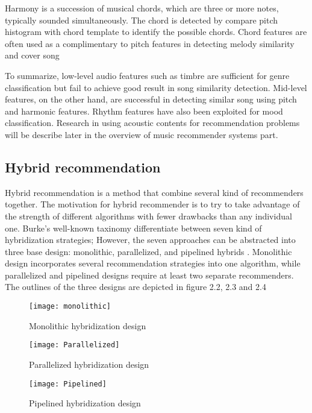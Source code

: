 Harmony is a succession of musical chords, which are three or more notes, typically sounded simultaneously. The chord is detected by compare pitch histogram with chord template to identify the possible chords. Chord features are often used as a complimentary to pitch features in detecting melody similarity and cover song \cite{ellis2007identifyingcover} \cite{bello2007audio}

To summarize, low-level audio features such as timbre are sufficient for genre classification but fail to achieve good result in song similarity detection. Mid-level features, on the other hand, are successful in detecting similar song using pitch and harmonic features. Rhythm features have also been exploited for mood classification. Research in using acoustic contents for recommendation problems will be describe later in the overview of music recommender systems part. 

\subsection{Hybrid recommendation}
Hybrid recommendation is a method that combine several kind of recommenders together. The motivation for hybrid recommender is to try to take advantage of the strength of different algorithms with fewer drawbacks than any individual one. Burke's well-known taxinomy \cite{burke2002hybrid} differentiate between seven kind of hybridization strategies; However, the seven approaches can be abstracted into three base design: monolithic, parallelized, and pipelined hybrids \cite{jannach2010recommender}. Monolithic design incorporates several recommendation strategies into one algorithm, while parallelized and pipelined designs require at least two separate recommenders. The outlines of the three designs are depicted in figure 2.2, 2.3 and 2.4

\begin{figure}[h]
\texttt{[image: monolithic]}
\centering
\caption{Monolithic hybridization design}

\end{figure}

\begin{figure}[h]
\texttt{[image: Parallelized]}
\centering
\caption{Parallelized hybridization design}

\end{figure}

\begin{figure}[h]
\texttt{[image: Pipelined]}
\centering
\caption{Pipelined hybridization design}

\end{figure}

